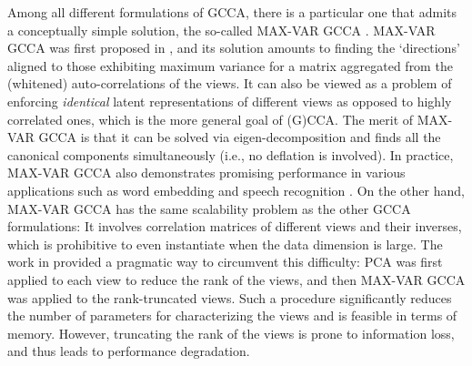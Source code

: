 \documentclass[10pt,journal]{IEEEtran}
\begin{document}
Among all different formulations of GCCA, there is a particular one that admits a conceptually simple solution, the so-called MAX-VAR GCCA \cite{carroll1968generalization,van2006generalized,kettenring1971canonical}.
MAX-VAR GCCA was first proposed in \cite{carroll1968generalization}, and its solution amounts to finding the `directions' aligned to those exhibiting maximum variance for a matrix aggregated from the (whitened) auto-correlations of the views.
It can also be viewed as a problem of enforcing {\em identical} latent representations of different views as opposed to highly correlated ones, which is the more general goal of (G)CCA.
The merit of MAX-VAR GCCA is that it can be solved via eigen-decomposition
and finds all the canonical components simultaneously (i.e., no deflation is involved).
In practice, MAX-VAR GCCA also demonstrates promising performance in various applications such as word embedding \cite{rastogimultiview} and speech recognition \cite{arora2014multi}.
On the other hand, MAX-VAR GCCA has the same scalability problem as the other GCCA formulations:
It involves correlation matrices of different views and their inverses, which is prohibitive to even instantiate when the data dimension is large.
The work in \cite{rastogimultiview} provided a pragmatic way to circumvent this difficulty: PCA was first applied to each view to reduce the rank of the views,
and then MAX-VAR GCCA was applied to the rank-truncated views. Such a procedure significantly reduces
the number of parameters for characterizing the views and is feasible in terms of memory. However, truncating the rank of the views is prone to information loss, and thus leads to performance degradation.
\end{document}
